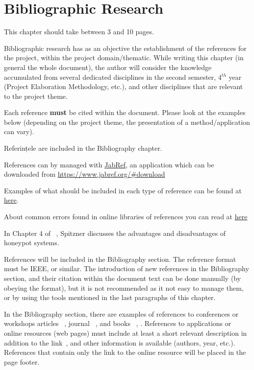 \chapter{Bibliographic Research}\label{ch:studiubib}

\pagestyle{fancy}


{\color{blue}\noindent This chapter should take between 3 and 10 pages.\\}

Bibliographic research has as an objective the establishment of the references for the project, within the project domain/thematic. While writing this chapter (in general the whole document), the author will consider the knowledge accumulated from several dedicated disciplines in the second semester, 4$^{th}$ year (Project Elaboration Methodology, etc.), and other disciplines that are relevant to the project theme.

Each reference \textbf{must} be cited within the document. Please look at the examples below (depending on the project theme, the presentation of a method/application can vary).

Referințele are included in the Bibliography chapter.

References can by managed with \href{https://www.jabref.org/}{JabRef}, an application which can be downloaded from \url{https://www.jabref.org/#download}

Examples of what should be included in each type of reference can be found at \href{https://libguides.nps.edu/citation/ieee-bibtex}{here}.

About common errors found in online libraries of references you can read at \href{https://www.ece.ucdavis.edu/~jowens/biberrors.html}{here}


In Chapter 4 of ~\cite{Spizner2002}, Spitzner discusses the advantages and disadvantages of honeypot systems.

References will be included in the Bibliography section. The reference format must be IEEE, or similar. The introduction of new references in the Bibliography section, and their citation within the document text can be done manually (by obeying the format), but it is not recommended as it not easy to manage them, or by using the tools mentioned in the last paragraphs of this chapter.

In the Bibliography section, there are examples of references to conferences or workshops articles ~\cite{AntoniouSBB05}, journal ~\cite{AntoniouSBDB07}, and books ~\cite{russell1995artificial}, \cite{Spizner2002}. References to applications or online resources (web pages) must include at least a short relevant description in addition to the link~\cite{seleweb}, and other information is available (authors, year, etc.). References that contain only the link to the online resource will be placed in the page footer.

